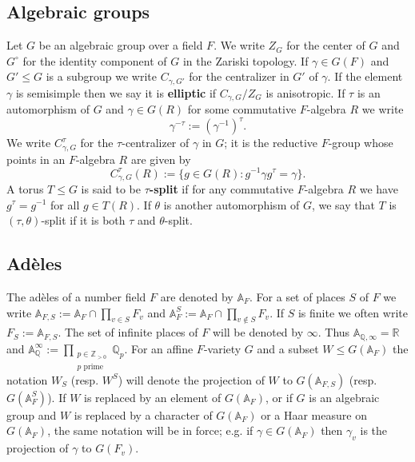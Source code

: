 \documentclass[12pt]{amsart}
\theoremstyle{remark}
\numberwithin{equation}{section}
\newcommand{\A}{\mathbb{A}}
\newcommand{\ZZ}{\mathbb{Z}}
\newcommand{\QQ}{\mathbb{Q}}
\newcommand{\RR}{\mathbb{R}}
\theoremstyle{definition}
\numberwithin{equation}{subsection}
\newcommand{\p}{{\sf p}}
\begin{document}
\subsection{Algebraic groups}
\label{notatAlggroups} Let $G$ be an algebraic group over a field
$F$. We write $Z_G$ for the center of $G$ and $G^{\circ}$ for the
identity component of $G$ in the Zariski topology.  If $\gamma \in
G(F)$ and $G' \leq G$ is a subgroup we write $C_{\gamma,G'}$ for the
centralizer in $G'$ of $\gamma$.  If the element $\gamma$ is semisimple then we say it is
\textbf{elliptic} if $C_{\gamma,G}/Z_G$ is anisotropic.  If $\tau$ is an automorphism of $G$ and
$\gamma \in G(R)$ for some commutative $F$-algebra $R$ we write
$$
\gamma^{-\tau}:=(\gamma^{-1})^{\tau}.
$$
We write $C_{\gamma,G}^{\tau}$ for the $\tau$-centralizer of $\gamma$ in $G$; it is the reductive $F$-group
whose points in an $F$-algebra $R$ are given by
$$
C_{\gamma,G}^{\tau}(R):=\{g \in G(R):g^{-1}\gamma g^{\tau}=\gamma\}.
$$
A torus $T \leq G$ is said to be \textbf{$\tau$-split} if for any
commutative $F$-algebra $R$ we have $g^{\tau}=g^{-1}$ for all $g
\in T(R)$.  If $\theta$ is another automorphism of $G$, we say that $T$ is $(\tau,\theta)$-split if it is both $\tau$ and $\theta$-split.


\subsection{Ad\`eles}
The ad\`eles of a number field $F$ are denoted by $\A_F$. For a
set of places $S$ of $F$ we write $\A_{F,S}:=\A_F \cap \prod_{v \in
S}F_v$ and $\A^S_F:=\A_F \cap \prod_{v \not \in S}F_v$.  If $S$ is finite we often write $F_S:=\A_{F,S}$.  The set of
infinite places of $F$ will be denoted by $\infty$. Thus
$\A_{\QQ,\infty}=\RR$ and $\A_{\QQ}^{\infty}:=\prod_{\substack{p \in
\ZZ_{>0}
\\p \textrm{ prime}}}\QQ_p$. For an affine $F$-variety $G$ and a
subset $W \leq G(\A_F)$ the notation $W_{S}$ (resp. $W^S$) will
denote the projection of $W$ to $G(\A_{F,S})$ (resp. $G(\A^S_F)$).
If $W$ is replaced by an element of $G(\A_F)$, or if $G$ is an
algebraic group and $W$ is replaced by a character of $G(\A_F)$ or a
Haar measure on $G(\A_F)$, the same notation will be in force; e.g. if
$\gamma \in G(\A_F)$ then $\gamma_v$ is the projection of $\gamma$ to $G(F_v)$.
\end{document}
